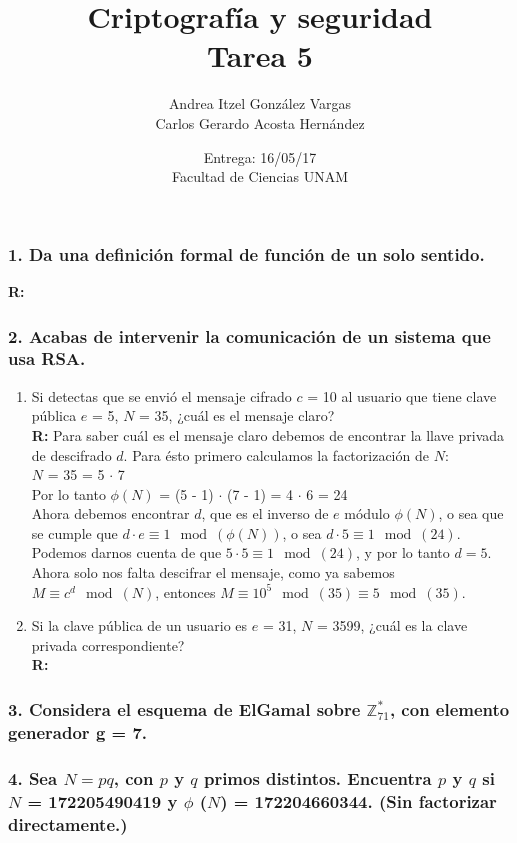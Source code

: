 \documentclass[14pt]{article}
\title{Criptografía y seguridad \\ Tarea 5}
\author{Andrea Itzel González Vargas \\ Carlos Gerardo Acosta Hernández}
\date{Entrega: 16/05/17 \\ Facultad de Ciencias UNAM}
\begin{document}
\maketitle

\subsubsection*{1. Da una definición formal de función de un solo sentido.}
\textbf{R:} 

\subsubsection*{2. Acabas de intervenir la comunicación de un sistema que usa RSA.}
\begin{enumerate}[label=\alph*)]
\item Si detectas que se envió el mensaje cifrado $c$ = 10 al usuario que tiene clave pública $e$ = 5, $N$ = 35, ¿cuál es el mensaje claro? \\
  \textbf{R:} Para saber cuál es el mensaje claro debemos de encontrar la llave privada de descifrado $d$. Para ésto primero calculamos la factorización de $N$: \\
  $N$ = 35 = 5 $\cdot$ 7 \\
  Por lo tanto $\phi(N)$ = (5 - 1) $\cdot$ (7 - 1) = 4 $\cdot$ 6 = 24 \\
  Ahora debemos encontrar $d$, que es el inverso de $e$ módulo $\phi(N)$, o sea que se cumple que $d \cdot e \equiv 1 \mod(\phi(N))$, o sea $d \cdot 5 \equiv 1 \mod(24)$. Podemos darnos cuenta de que $5 \cdot 5 \equiv 1 \mod(24)$, y por lo tanto $d = 5$. Ahora solo nos falta descifrar el mensaje, como ya sabemos $M \equiv c^d \mod(N)$, entonces $M \equiv 10^5 \mod(35) \equiv 5 \mod(35)$.
  
\item Si la clave pública de un usuario es $e$ = 31, $N$ = 3599, ¿cuál es la clave privada correspondiente? \\
  \textbf{R:}
\end{enumerate}

\subsubsection*{3. Considera el esquema de ElGamal sobre $\mathbb{Z}^*_{71}$, con elemento generador g = 7.}

\subsubsection*{4. Sea $N = pq$, con $p$ y $q$ primos distintos. Encuentra $p$ y $q$ si $N$ = 172205490419 y $\phi$ ($N$) = 172204660344. (Sin factorizar directamente.)}
\end{document}
